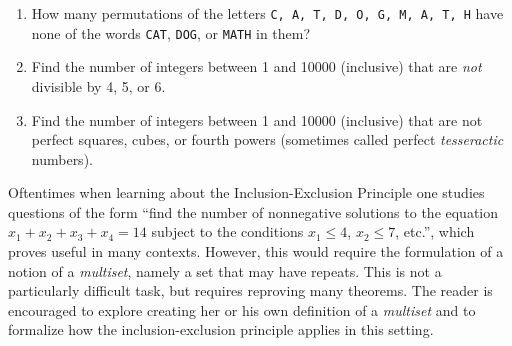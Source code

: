 \begin{examples}
\begin{enumerate}
    \item How many permutations of the letters \texttt{C, A, T, D, O, G, M, A, T, H} have none of the words \texttt{CAT}, \texttt{DOG}, or \texttt{MATH} in them?
    \item Find the number of integers between 1 and 10000 (inclusive) that are \textit{not} divisible by 4, 5, or 6.
    \item Find the number of integers between 1 and 10000 (inclusive) that are not perfect squares, cubes, or fourth powers (sometimes called perfect \textit{tesseractic} numbers).
\end{enumerate}
\end{examples}

\begin{remark} Oftentimes when learning about the Inclusion-Exclusion Principle one studies questions of the form ``find the number of nonnegative solutions to the equation $x_1 + x_2 + x_3 + x_4 = 14$ subject to the conditions $x_1 \leq 4$, $x_2 \leq 7$, etc.'', which proves useful in many contexts.  However, this would require the formulation of a notion of a \textit{multiset}, namely a set that may have repeats.  This is not a particularly difficult task, but requires reproving many theorems.  The reader is encouraged to explore creating her or his own definition of a \textit{multiset} and to formalize how the inclusion-exclusion principle applies in this setting.
\end{remark}
